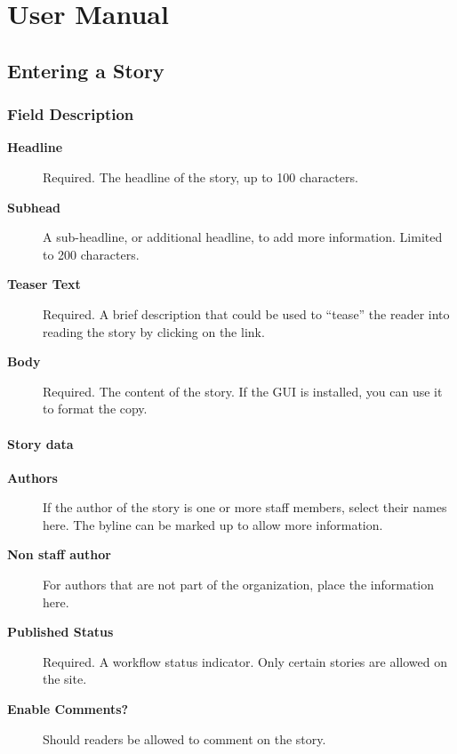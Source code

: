 \documentclass[letterpaper,10pt,english]{manual}
\begin{document}
\resetcurrentobjects
\hypertarget{--doc-user/index}{}

\hypertarget{user-index}{}\chapter{User Manual}

\resetcurrentobjects
\hypertarget{--doc-user/storyentry}{}

\section{Entering a Story}


\subsection{Field Description}
\begin{description}
\item[\textbf{Headline}] \leavevmode
Required. The headline of the story, up to 100 characters.

\item[\textbf{Subhead}] \leavevmode
A sub-headline, or additional headline, to add more information. Limited to 200 characters.

\item[\textbf{Teaser Text}] \leavevmode
Required. A brief description that could be used to ``tease'' the reader into reading the story by clicking on the link.

\item[\textbf{Body}] \leavevmode
Required. The content of the story. If the GUI is installed, you can use it to format the copy.

\end{description}


\subsubsection{Story data}
\begin{description}
\item[\textbf{Authors}] \leavevmode
If the author of the story is one or more staff members, select their names here. The byline can be marked up to allow more information.

\item[\textbf{Non staff author}] \leavevmode
For authors that are not part of the organization, place the information here.

\item[\textbf{Published Status}] \leavevmode
Required. A workflow status indicator. Only certain stories are allowed on the site.

\item[\textbf{Enable Comments?}] \leavevmode
Should readers be allowed to comment on the story.

\end{description}
\end{document}
